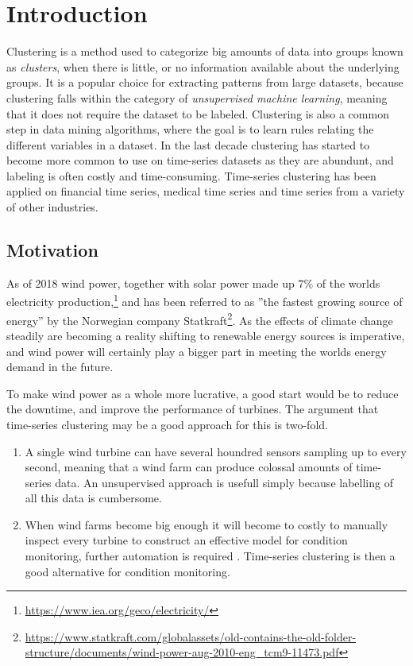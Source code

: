 \chapter{Introduction}

Clustering is a method used to categorize big amounts of data into groups known as \textit{clusters}, when there is little, or no information available about the underlying groups. It is a popular choice for extracting patterns from large datasets, because clustering falls within the category of \textit{unsupervised machine learning}, meaning that it does not require the dataset to be labeled. Clustering is also a common step in data mining algorithms, where the goal is to learn rules relating the different variables in a dataset. In the last decade clustering has started to become more common to use on time-series datasets as they are abundunt, and labeling is often costly and time-consuming. Time-series clustering has been applied on financial time series, medical time series and time series from a variety of other industries. \bigskip

\section{Motivation}

As of 2018 wind power, together with solar power made up $7\%$ of the worlds electricity production,\footnote{\url{https://www.iea.org/geco/electricity/}} and has been referred to as ''the fastest growing source of energy'' by the Norwegian company Statkraft\footnote{\url{https://www.statkraft.com/globalassets/old-contains-the-old-folder-structure/documents/wind-power-aug-2010-eng_tcm9-11473.pdf}}. As the effects of climate change steadily are becoming a reality shifting to renewable energy sources is imperative, and wind power will certainly play a bigger part in meeting the worlds energy demand in the future. \bigskip

To make wind power as a whole more lucrative, a good start would be to reduce the downtime, and improve the performance of turbines. The argument that time-series clustering may be a good approach for this is two-fold. 

\begin{enumerate}
    \item A single wind turbine can have several houndred sensors sampling up to every second, meaning that a wind farm can produce colossal amounts of time-series data. An unsupervised approach is usefull simply because labelling of all this data is cumbersome.
    \item When wind farms become big enough it will become to costly to manually inspect every turbine to construct an effective model for condition monitoring, further automation is required \cite{espen}. Time-series clustering is then a good alternative for condition monitoring.
\end{enumerate}

